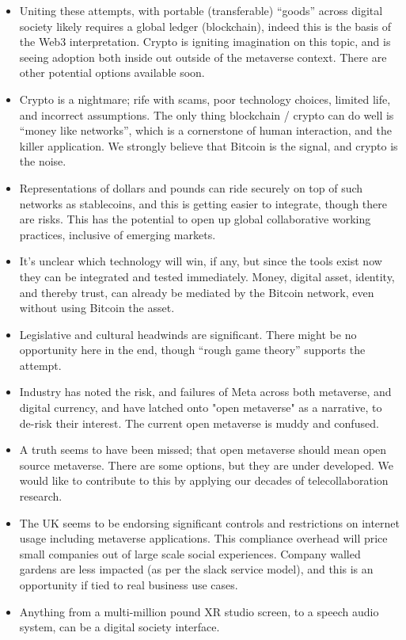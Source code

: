 \begin{itemize}
\item Uniting these attempts, with portable (transferable) ``goods'' across digital society likely requires a global ledger (blockchain), indeed this is the basis of the Web3 interpretation. Crypto is igniting imagination on this topic, and is seeing adoption both inside out outside of the metaverse context. There are other potential options available soon.
\item Crypto is a nightmare; rife with scams, poor technology choices, limited life, and incorrect assumptions. The only thing blockchain / crypto can do well is ``money like networks'', which is a cornerstone of human interaction, and the killer application. We strongly believe that Bitcoin is the signal, and crypto is the noise.
\item Representations of dollars and pounds can ride securely on top of such networks as stablecoins, and this is getting easier to integrate, though there are risks. This has the potential to open up global collaborative working practices, inclusive of emerging markets.
\item It's unclear which technology will win, if any, but since the tools exist now they can be integrated and tested immediately. Money, digital asset, identity, and thereby trust, can already be mediated by the Bitcoin network, even without using Bitcoin the asset. 
\item Legislative and cultural headwinds are significant. There might be no opportunity here in the end, though ``rough game theory'' supports the attempt.
\item Industry has noted the risk, and failures of Meta across both metaverse, and digital currency, and have latched onto "open metaverse" as a narrative, to de-risk their interest. The current open metaverse is muddy and confused. 
\item A truth seems to have been missed; that open metaverse should mean open source metaverse. There are some options, but they are under developed. We would like to contribute to this by applying our decades of telecollaboration research. 
\item The UK seems to be endorsing significant controls and restrictions on internet usage including metaverse applications. This compliance overhead will price small companies out of large scale social experiences. Company walled gardens are less impacted (as per the slack service model), and this is an opportunity if tied to real business use cases.
\item Anything from a multi-million pound XR studio screen, to a speech audio system, can be a digital society interface.

\end{itemize}
